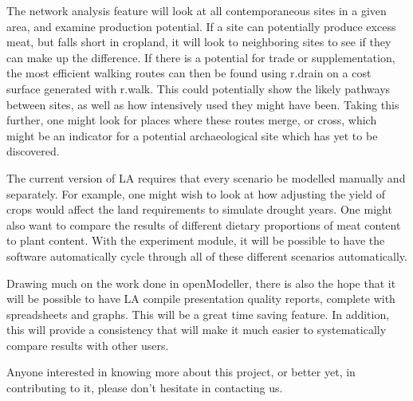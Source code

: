   The network analysis feature will look at all contemporaneous sites in a given
  area, and examine production potential.  If a site can potentially produce
  excess meat, but falls short in cropland, it will look to neighboring sites to
  see if they can make up the difference.  If there is a potential for trade or
  supplementation, the most efficient walking routes can then be found using
  r.drain on a cost surface generated with r.walk.  This could potentially show
  the likely pathways between sites, as well as how intensively used they might
  have been.  Taking this further, one might look for places where these routes
  merge, or cross, which might be an indicator for a potential archaeological
  site which has yet to be discovered.

  The current version of LA requires that every scenario be modelled
  manually and separately.  For example, one might wish to look at how adjusting
  the yield of crops would affect the land requirements to simulate drought
  years.  One might also want to compare the results of different dietary
  proportions of meat content to plant content.  With the experiment module, it
  will be possible to have the software automatically cycle through all of these
  different scenarios automatically.

  Drawing much on the work done in openModeller, there is also the hope that it
  will be possible to have LA compile presentation quality reports,
  complete with spreadsheets and graphs.  This will be a great time saving
  feature.  In addition, this will provide a consistency that will make it much
  easier to systematically compare results with other users.

  Anyone interested in knowing more about this project, or better yet, in
  contributing to it, please don't hesitate in contacting us.











\begin{footnotesize}



\end{footnotesize}


